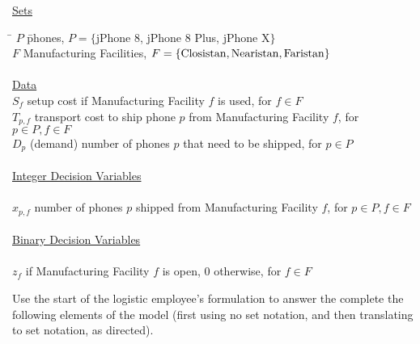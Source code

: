 \documentclass[10pt]{article}
\begin{document}
\bigskip
\noindent\underline{Sets}
\begin{tabbing}
\hspace{.5cm} \= $P$ \hspace{2.5cm} \= phones, $P=\{$jPhone 8, jPhone 8 Plus, jPhone X$\}$ \\
\> $F$ \> Manufacturing Facilities, $F=\{{\rm Closistan,Nearistan,Faristan} \}$\\

\\
\noindent\underline{Data}\\%
\> ${S}_{f}$ \> setup cost if Manufacturing Facility $f$ is used, for $f \in F$\\
\> ${T}_{p,f}$ \> transport cost to ship phone $p$ from Manufacturing Facility $f$, for $p \in P, f \in F$ \\
\> ${D}_{p}$ \> (demand) number of phones $p$ that need to be shipped, for $p \in P$ \\
\\

\noindent\underline{Integer Decision Variables}\\%
\\
\> $x_{p,f}$ \> number of phones $p$ shipped from Manufacturing Facility $f$, for $p \in P, f \in F$  \\
\\
\noindent\underline{Binary Decision Variables}\\%
\\
\> $z_{f}$  if Manufacturing Facility $f$ is open, 0 otherwise, for $f \in F$  \\
\end{tabbing}

\noindent
Use the start of the logistic employee's formulation to answer the complete the following elements of the model (first using no set notation, and then translating to set notation, as directed).
\end{document}
